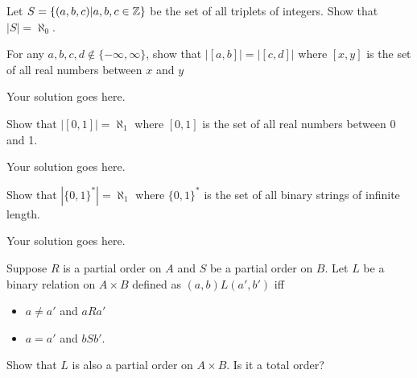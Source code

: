 \documentclass[12pt]{article}
\begin{document}
    \noindent
    
    \onehalfspace

    \begin{question}
        Let $S = \{(a,b,c) | a,b,c \in \mathbb{Z}\}$ be the set of all triplets of integers. Show that $|S| = \aleph_0$.
    \end{question}

    \begin{solution}
        
    \end{solution}

    \begin{question}
        For any $a,b,c,d \not \in \{-\infty, \infty\}$, show that $|[a,b]| = |[c,d]|$ where $[x,y]$ is the set of all real numbers between $x$ and $y$
    \end{question}
    \begin{solution}
        Your solution goes here.
    \end{solution}

    \begin{question}
        Show that $|[0,1]| = \aleph_1$ where $[0,1]$ is the set of all real numbers between 0 and 1.
    \end{question}
    
    \begin{solution}
        Your solution goes here.
    \end{solution}

    \begin{question}
        Show that $|\{0,1\}^*| = \aleph_1$ where $\{0,1\}^*$ is the set of all binary strings of infinite length.
    \end{question}
    
    \begin{solution}
        Your solution goes here.
    \end{solution}

    \begin{question}
        Suppose $R$ is a partial order on $A$ and $S$ be a partial order on $B$. Let $L$ be a binary relation on $A \times B$ defined as $(a,b)L(a',b')$ iff
        \begin{itemize}
            \item $a \neq a'$ and $aRa'$
            \item $a = a'$ and $bSb'$.
        \end{itemize}
        Show that $L$ is also a partial order on $A \times B$. Is it a total order?
    \end{question}
\end{document}
